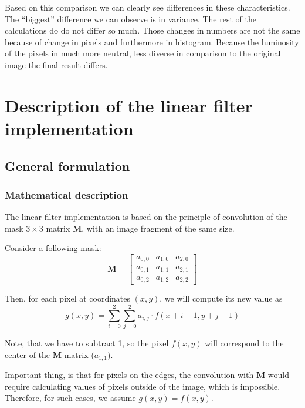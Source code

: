 \documentclass[12pt]{article}
\begin{document}
Based on this  comparison we can clearly see differences in these characteristics. 
The ``biggest'' difference we can observe is in variance. 
The rest of the calculations do do not differ so much. 
Those changes in numbers are not the same because of change in pixels and furthermore in histogram. 
Because the luminosity of the pixels in much more neutral, less diverse in comparison to the original image the final result differs.

\section{Description of the linear filter implementation}

\subsection{General formulation}

\subsubsection{Mathematical description}

The linear filter implementation is based on the principle of convolution of the mask $3\times3$ matrix $\mathbf{M}$, with an image fragment of the same size.

Consider a following mask:
\begin{equation}
    \mathbf{M} = \begin{bmatrix}
        a_{0,0} & a_{1,0} & a_{2,0} \\
        a_{0,1} & a_{1,1} & a_{2,1} \\
        a_{0,2} & a_{1,2} & a_{2,2}
    \end{bmatrix}
\end{equation}

Then, for each pixel at coordinates $(x,y)$, we will compute its new value as
\begin{equation}
    g(x,y) = \sum\limits_{i=0}^2 \sum\limits_{j=0}^2 a_{i,j} \cdot f(x + i - 1, y + j - 1)
\end{equation}

Note, that we have to subtract 1, so the pixel $f(x,y)$ will correspond to the center of the $\mathbf{M}$ matrix ($a_{1,1}$).

Important thing, is that for pixels on the edges,
the convolution with $\mathbf{M}$ would require calculating values of pixels outside of the image, which is impossible.
Therefore, for such cases, we assume $g(x,y) = f(x,y)$.
\end{document}
